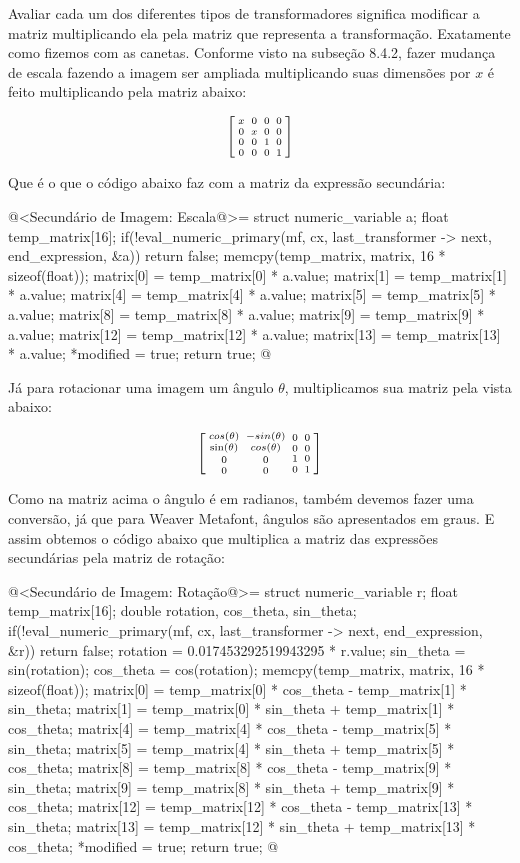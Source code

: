 {Avaliar cada um dos diferentes tipos de transformadores significa
modificar a matriz multiplicando ela pela matriz que representa a
transformação. Exatamente como fizemos com as canetas. Conforme visto
na subseção 8.4.2, fazer mudança de escala fazendo a imagem ser
ampliada multiplicando suas dimensões por $x$ é feito multiplicando
pela matriz abaixo:


$$\left[{{x \atop 0}\atop {0\atop
      0}}{{0 \atop x}\atop {0 \atop 0}}{{0\atop 0}\atop{1 \atop
      0}}{{0 \atop 0}\atop{0\atop 1}}\right]
$$

Que é o que o código abaixo faz com a matriz da expressão secundária:

\iniciocodigo
@<Secundário de Imagem: Escala@>=
struct numeric_variable a;
float temp_matrix[16];
if(!eval_numeric_primary(mf, cx, last_transformer -> next, end_expression, &a))
  return false;
memcpy(temp_matrix, matrix, 16 * sizeof(float));
matrix[0] = temp_matrix[0] * a.value;
matrix[1] = temp_matrix[1] * a.value;
matrix[4] = temp_matrix[4] * a.value;
matrix[5] = temp_matrix[5] * a.value;
matrix[8] = temp_matrix[8] * a.value;
matrix[9] = temp_matrix[9] * a.value;
matrix[12] = temp_matrix[12] * a.value;
matrix[13] = temp_matrix[13] * a.value;
*modified = true;
return true;
@
\fimcodigo

Já para rotacionar uma imagem um ângulo $\theta$, multiplicamos sua
matriz pela vista abaixo:

$$\left[{{cos(\theta) \atop \sin(\theta)}\atop
      {0\atop 0}}{{-sin(\theta) \atop cos(\theta)}\atop {0 \atop
      0}}{{0\atop 0}\atop{1 \atop 0}}{{0 \atop 0}\atop{0\atop
      1}}\right]
$$

Como na matriz acima o ângulo é em radianos, também devemos fazer uma
conversão, já que para Weaver Metafont, ângulos são apresentados em
graus. E assim obtemos o código abaixo que multiplica a matriz das
expressões secundárias pela matriz de rotação:

\iniciocodigo
@<Secundário de Imagem: Rotação@>=
struct numeric_variable r;
float temp_matrix[16];
double rotation, cos_theta, sin_theta;
if(!eval_numeric_primary(mf, cx, last_transformer -> next, end_expression, &r))
  return false;
rotation = 0.017453292519943295 * r.value;
sin_theta = sin(rotation);
cos_theta = cos(rotation);
memcpy(temp_matrix, matrix, 16 * sizeof(float));
matrix[0] = temp_matrix[0] * cos_theta - temp_matrix[1] * sin_theta;
matrix[1] = temp_matrix[0] * sin_theta + temp_matrix[1] * cos_theta;
matrix[4] = temp_matrix[4] * cos_theta - temp_matrix[5] * sin_theta;
matrix[5] = temp_matrix[4] * sin_theta + temp_matrix[5] * cos_theta;
matrix[8] = temp_matrix[8] * cos_theta - temp_matrix[9] * sin_theta;
matrix[9] = temp_matrix[8] * sin_theta + temp_matrix[9] * cos_theta;
matrix[12] = temp_matrix[12] * cos_theta - temp_matrix[13] * sin_theta;
matrix[13] = temp_matrix[12] * sin_theta + temp_matrix[13] * cos_theta;
*modified = true;
return true;
@
\fimcodigo

}
